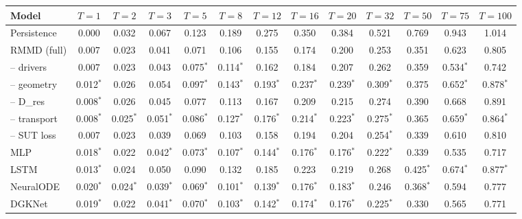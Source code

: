 \begin{tabular}{lcccccccccccc}
\toprule
Model & $T=1$ & $T=2$ & $T=3$ & $T=5$ & $T=8$ & $T=12$ & $T=16$ & $T=20$ & $T=32$ & $T=50$ & $T=75$ & $T=100$ \\
\midrule
Persistence & 0.000 & 0.032 & 0.067 & 0.123 & 0.189 & 0.275 & 0.350 & 0.384 & 0.521 & 0.769 & 0.943 & 1.014 \\
RMMD (full) & 0.007 & 0.023 & 0.041 & 0.071 & 0.106 & 0.155 & 0.174 & 0.200 & 0.253 & 0.351 & 0.623 & 0.805 \\
– drivers & 0.007 & 0.023 & 0.043 & 0.075$^*$ & 0.114$^*$ & 0.162 & 0.184 & 0.207 & 0.262 & 0.359 & 0.534$^*$ & 0.742 \\
– geometry & 0.012$^*$ & 0.026 & 0.054 & 0.097$^*$ & 0.143$^*$ & 0.193$^*$ & 0.237$^*$ & 0.239$^*$ & 0.309$^*$ & 0.375 & 0.652$^*$ & 0.878$^*$ \\
– D_res & 0.008$^*$ & 0.026 & 0.045 & 0.077 & 0.113 & 0.167 & 0.209 & 0.215 & 0.274 & 0.390 & 0.668 & 0.891 \\
– transport & 0.008$^*$ & 0.025$^*$ & 0.051$^*$ & 0.086$^*$ & 0.127$^*$ & 0.176$^*$ & 0.214$^*$ & 0.223$^*$ & 0.275$^*$ & 0.365 & 0.659$^*$ & 0.864$^*$ \\
– SUT loss & 0.007 & 0.023 & 0.039 & 0.069 & 0.103 & 0.158 & 0.194 & 0.204 & 0.254$^*$ & 0.339 & 0.610 & 0.810 \\
MLP & 0.018$^*$ & 0.022 & 0.042$^*$ & 0.073$^*$ & 0.107$^*$ & 0.144$^*$ & 0.176$^*$ & 0.176$^*$ & 0.222$^*$ & 0.339 & 0.535 & 0.717 \\
LSTM & 0.013$^*$ & 0.024 & 0.050 & 0.090 & 0.132 & 0.185 & 0.223 & 0.219 & 0.268 & 0.425$^*$ & 0.674$^*$ & 0.877$^*$ \\
NeuralODE & 0.020$^*$ & 0.024$^*$ & 0.039$^*$ & 0.069$^*$ & 0.101$^*$ & 0.139$^*$ & 0.176$^*$ & 0.183$^*$ & 0.246 & 0.368$^*$ & 0.594 & 0.777 \\
DGKNet & 0.019$^*$ & 0.022 & 0.041$^*$ & 0.070$^*$ & 0.103$^*$ & 0.142$^*$ & 0.174$^*$ & 0.176$^*$ & 0.225$^*$ & 0.330 & 0.565 & 0.771 \\
\bottomrule
\end{tabular}